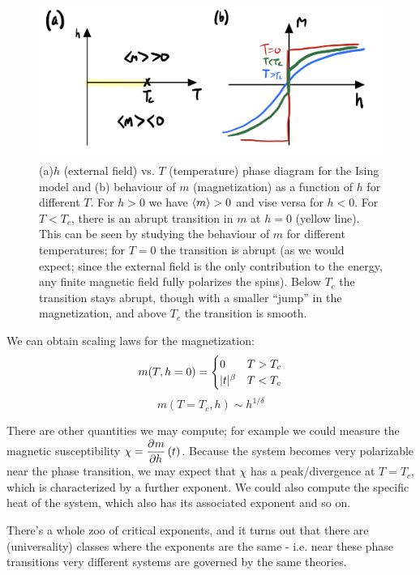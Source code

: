 \begin{figure}[htbp!]
    \centering
    \includegraphics[scale=0.55]{Lectures/Figures/Ising_phases.png}
    \caption{(a)$h$ (external field) vs. $T$ (temperature) phase diagram for the Ising model and (b) behaviour of $m$ (magnetization) as a function of $h$ for different $T$. For $h > 0$ we have $\left< m \right> > 0$ and vise versa for $h < 0$. For $T < T_c$, there is an abrupt transition in $m$ at $h=0$ (yellow line). This can be seen by studying the behaviour of $m$ for different temperatures; for $T = 0$ the transition is abrupt (as we would expect; since the external field is the only contribution to the energy, any finite magnetic field fully polarizes the spins). Below $T_c$ the transition stays abrupt, though with a smaller ``jump'' in the magnetization, and above $T_c$ the transition is smooth.}
    \label{fig:Ising_phases}
\end{figure}

We can obtain scaling laws for the magnetization:
\begin{equation}
    m(T, h = 0) = \begin{cases} 0 & T > T_c \\ \lvert t \rvert^\beta & T< T_c \end{cases}
\end{equation}
\begin{equation}
    m(T = T_c, h) \sim h^{1/\delta}
\end{equation}

There are other quantities we may compute; for example we could measure the magnetic susceptibility $\chi = \dpd{m}{h}(t)$. Because the system becomes very polarizable near the phase transition, we may expect that $\chi$ has a peak/divergence at $T = T_c$, which is characterized by a further exponent. We could also compute the specific heat of the system, which also has its associated exponent and so on.

There's a whole zoo of critical exponents, and it turns out that there are (universality) classes where the exponents are the same - i.e. near these phase transitions very different systems are governed by the same theories.

